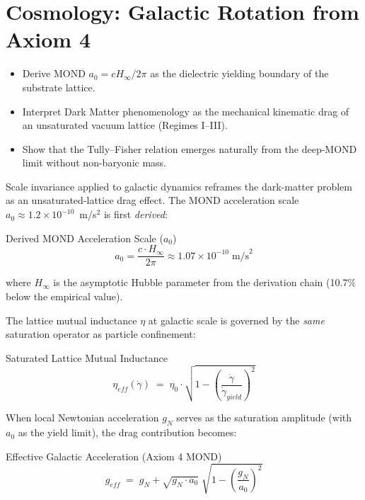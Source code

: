 
\chapter{Cosmology: Galactic Rotation from Axiom 4}
\label{ch:cosmology_v7}


\begin{objectivebox}
\begin{itemize}
    \item Derive MOND $a_0 = cH_\infty / 2\pi$ as the dielectric yielding boundary of the substrate lattice.
    \item Interpret Dark Matter phenomenology as the mechanical kinematic drag of an unsaturated vacuum lattice (Regimes I--III).
    \item Show that the Tully--Fisher relation emerges naturally from the deep-MOND limit without non-baryonic mass.
\end{itemize}
\end{objectivebox}

Scale invariance applied to galactic dynamics reframes the
dark-matter problem as an unsaturated-lattice drag effect.  The MOND acceleration scale
$a_0 \approx 1.2 \times 10^{-10}$~m/s$^2$ is first \textit{derived}:
\begin{resultbox}{Derived MOND Acceleration Scale ($a_0$)}
\begin{equation}
    a_0 = \frac{c \cdot H_\infty}{2\pi}
    \approx 1.07 \times 10^{-10}\;\text{m/s}^2
    \label{eq:a0_derived}
\end{equation}
\end{resultbox}
where $H_\infty$ is the asymptotic Hubble parameter from the derivation
chain (10.7\% below the empirical value).

The lattice mutual inductance $\eta$ at galactic scale is governed
by the \textit{same} saturation operator as particle confinement:
\begin{resultbox}{Saturated Lattice Mutual Inductance}
\begin{equation}
    \eta_{eff}(\dot\gamma) \;=\; \eta_0 \cdot
    \sqrt{1 - \left(\frac{\dot\gamma}{\dot\gamma_{yield}}\right)^{\!2}}
    \label{eq:galactic_inductance}
\end{equation}
\end{resultbox}
When local Newtonian acceleration $g_N$ serves as the saturation
amplitude (with $a_0$ as the yield limit), the drag contribution
becomes:
\begin{resultbox}{Effective Galactic Acceleration (Axiom 4 MOND)}
\begin{equation}
    g_{eff} \;=\; g_N + \sqrt{g_N \cdot a_0}\;
    \sqrt{1 - \left(\frac{g_N}{a_0}\right)^{2}}
    \label{eq:saturation_mond}
\end{equation}
\end{resultbox}

